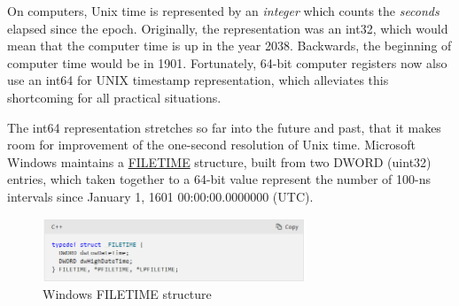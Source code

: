 On computers, Unix time is represented by an \emph{integer} which counts the \emph{seconds} elapsed since the epoch. Originally, the representation was an \textsf{int32}, which would mean that the computer time is up in the year 2038. Backwards, the beginning of computer time would be in 1901.
Fortunately, 64-bit computer registers now also use an \textsf{int64} for UNIX timestamp representation, which alleviates this shortcoming for all practical situations.

The \textsf{int64} representation stretches so far into the future and past, that it makes room for improvement of the one-second resolution of Unix time. Microsoft Windows maintains a \href{https://learn.microsoft.com/en-us/windows/win32/api/minwinbase/ns-minwinbase-filetime}{FILETIME} structure, built from two DWORD (uint32) entries, which taken together to a 64-bit value represent the number of 100-ns intervals since January 1, 1601 00:00:00.0000000 (UTC).

\begin{figure}[H]
	\centering
	\includegraphics[width=0.7\textwidth]{Figures/filetime.png}
	\caption{Windows FILETIME structure}
	\label{fig:filetime}
\end{figure}

